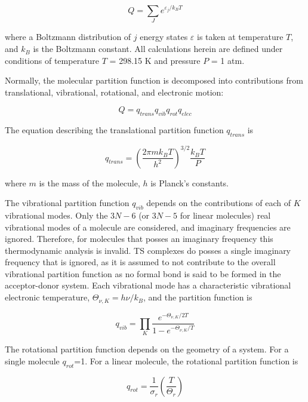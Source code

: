 \begin{equation}
  Q = \sum_J e^{\varepsilon_j/k_B T}
\end{equation}

\noindent where a Boltzmann distribution of $j$ energy states $\varepsilon$ is
taken at temperature $T$, and $k_B$ is the Boltzmann constant. All calculations
herein are defined under conditions of temperature $T$ = 298.15 K and pressure
$P$ = 1 atm.

Normally, the molecular partition function is decomposed into contributions
from translational, vibrational, rotational, and electronic motion:

\begin{equation}
  Q = q_{trans}q_{vib}q_{rot}q_{elec}
\end{equation}

\noindent The equation describing the translational partition function
$q_{trans}$ is

\begin{equation}
  q_{trans} = \left( \frac{2\pi m k_B T}{h^2} \right)^{3/2} \frac{k_B T}{P}
\end{equation}

\noindent where $m$ is the mass of the molecule, $h$ is Planck's constants.

The vibrational partition function $q_{vib}$ depends on the contributions of
each of $K$ vibrational modes. Only the $3N-6$ (or $3N-5$ for linear molecules)
real vibrational modes of a molecule are considered, and imaginary frequencies
are ignored. Therefore, for molecules that posses an imaginary frequency this
thermodynamic analysis is invalid. TS complexes do posses a single imaginary
frequency that is ignored, as it is assumed to not contribute to the overall
vibrational partition function as no formal bond is said to be formed in the
acceptor-donor system. Each vibrational mode has a characteristic vibrational
electronic temperature, $\Theta_{\nu,K} = h\nu/k_B$, and the partition function
is

\begin{equation}
  q_{vib} = \prod_K \frac{e^{-\Theta_{\nu,K}/2T}}{1 - e^{-\Theta_{\nu,K}/T}}
\end{equation}

The rotational partition function depends on the geometry of a system. For a
single molecule $q_{rot}$=1. For a linear molecule, the rotational partition
function is

\begin{equation}
  q_{rot} = \frac{1}{\sigma_r} \left(\frac{T}{\Theta_r}\right)
\end{equation}

